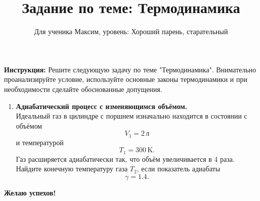 \documentclass[a4paper,12pt]{article}
\begin{document}
\title{Задание по теме: Термодинамика}
\author{Для ученика Максим, уровень: Хороший парень, старательный}
\date{}
\maketitle

\vspace{0.5cm}

\textbf{Инструкция:} Решите следующую задачу по теме "Термодинамика". Внимательно проанализируйте условие, используйте основные законы термодинамики и при необходимости сделайте обоснованные допущения.

\vspace{0.5cm}

\begin{enumerate}

\item \textbf{Адиабатический процесс с изменяющимся объёмом.} \\
Идеальный газ в цилиндре с поршнем изначально находится в состоянии с объёмом 
\[
V_1 = 2\,\mathrm{л}
\]
и температурой 
\[
T_1 = 300\,\mathrm{K}.
\] 
Газ расширяется адиабатически так, что объём увеличивается в 4 раза. Найдите конечную температуру газа $T_2$, если показатель адиабаты 
\[
\gamma = 1.4.
\]

\end{enumerate}

\vspace{0.5cm}

\textbf{Желаю успехов!}
\end{document}
